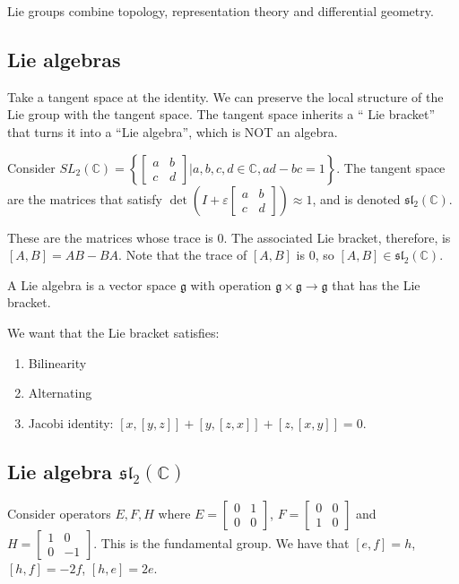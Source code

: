 \documentclass[]{report}
\theoremstyle{definition}
\numberwithin{theorem}{section}
\numberwithin{equation}{section}
\begin{document}
Lie groups combine topology, representation theory and differential geometry. 

\subsection{Lie algebras}
Take a tangent space at the identity. We can preserve the local structure of the Lie group with the tangent space. The tangent space inherits a `` Lie bracket'' that turns it into a ``Lie algebra'', which is NOT an algebra.

Consider $SL_2(\mathbb{C}) = \left\{
\begin{bmatrix}
	a & b\\
	c & d
\end{bmatrix}
| a, b, c, d \in \mathbb{C}, ad - bc = 1
\right\}
$. 
The tangent space are the matrices that satisfy $\det\left(I + \varepsilon \begin{bmatrix}
	a & b\\
	c & d
\end{bmatrix} \right) \approx 1$, and is denoted $\mathfrak{sl}_2(\mathbb{C})$.  

These are the matrices whose trace is $0$. The associated Lie bracket, therefore, is $\left[A, B\right] = AB - BA$. Note that the trace of $\left[A, B\right]$ is 0, so $[A, B] \in \mathfrak{sl}_2(\mathbb{C})$. 

A Lie algebra is a vector space $\mathfrak{g}$ with operation $\mathfrak{g} \times \mathfrak{g} \rightarrow \mathfrak{g}$ that has the Lie bracket. 

We want that the Lie bracket satisfies:
\begin{enumerate}
	\item Bilinearity
	\item Alternating
	\item Jacobi identity: $[x, [y,z]] + [y, [z, x]] + [z, [x, y]] = 0$. 
\end{enumerate}

\subsection{Lie algebra $\mathfrak{sl}_2(\mathbb{C})$}
Consider operators $E, F, H$ where $E = \begin{bmatrix}
	0 & 1\\
	0 & 0
\end{bmatrix}
$, $F = \begin{bmatrix}
	0 & 0 \\
	1 & 0
\end{bmatrix}
$ and
$ H = \begin{bmatrix}
	1 & 0\\
	0 & -1
\end{bmatrix}
$. This is the fundamental group. 
We have that $[e, f] = h$, $[h, f] = -2f$, $[h, e] = 2e$. 
\end{document}
